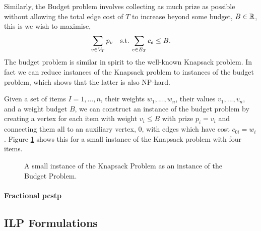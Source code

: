 Similarly, the Budget problem involves collecting as much prize as possible without allowing the
 total edge cost of $T$ to increase beyond some budget, $B \in \mathbb{R}$, this is we wish to maximise,
 $$\sum_{v \in V_T} p_v \quad \text{s.t.} \: \sum_{e \in E_T} c_e \leq B\mathnormal{.}$$
 The budget problem is similar in spirit to the well-known Knapsack problem. In fact we can
 reduce instances of the Knapsack problem to instances of the budget problem, which shows that
  the latter is also NP-hard.

 Given a set of items $I = 1,...,n$, their weights $w_1,...,w_n$, their values $v_1,...,v_n$, and
 a weight budget $B$, we
 can construct an instance of the budget problem by creating a vertex for each item with weight
 $v_i \leq B$ with prize $p_i = v_i$ and connecting them all to an auxiliary vertex, $0$, with
 edges which have cost $c_{0i} = w_i$. Figure \ref{fig:pcstp:budget:knapsack} shows this for
  a small instance of the Knapsack problem with four items.

 \begin{figure}[h!]\centering
{}
\caption{A small instance of the Knapsack Problem as an instance of the Budget Problem.}
\label{fig:pcstp:budget:knapsack}
\end{figure}

\paragraph{Fractional \gls{pcstp}}


\subsection{ILP Formulations}
